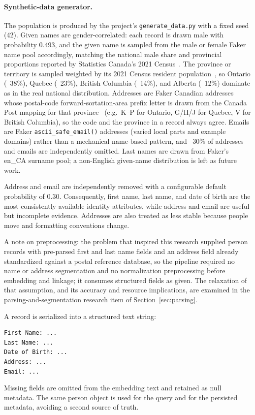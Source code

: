 \documentclass[11pt]{article}
\begin{document}
\paragraph{Synthetic-data generator.} The population is produced by the project\textquoteright s \texttt{generate\_data.py} with a fixed seed (42). Given names are gender-correlated: each record is drawn male with probability 0.493, and the given name is sampled from the male or female Faker name pool accordingly, matching the national male share and provincial proportions reported by Statistics Canada's 2021 Census~\cite{statcan2021pop}. The province or territory is sampled weighted by its 2021 Census resident population~\cite{statcan2021pop}, so Ontario (~38\%), Quebec (~23\%), British Columbia (~14\%), and Alberta (~12\%) dominate as in the real national distribution. Addresses are Faker Canadian addresses whose postal-code forward-sortation-area prefix letter is drawn from the Canada Post mapping for that province~\cite{canadapostfsa,wpcanadapost} (e.g.\ K--P for Ontario, G/H/J for Quebec, V for British Columbia), so the code and the province in a record always agree. Emails are Faker \texttt{ascii\_safe\_email()} addresses (varied local parts and example domains) rather than a mechanical name-based pattern, and ~30\% of addresses and emails are independently omitted. Last names are drawn from Faker\textquoteright s en\_CA surname pool; a non-English given-name distribution is left as future work.

Address and email are independently removed with a configurable default probability of 0.30. Consequently, first name, last name, and date of birth are the most consistently available identity attributes, while address and email are useful but incomplete evidence. Addresses are also treated as less stable because people move and formatting conventions change.

A note on preprocessing: the problem that inspired this research supplied person records with pre-parsed first and last name fields and an address field already standardized against a postal reference database, so the pipeline required no name or address segmentation and no normalization preprocessing before embedding and linkage; it consumes structured fields as given. The relaxation of that assumption, and its accuracy and resource implications, are examined in the parsing-and-segmentation research item of Section~\ref{sec:parsing}.

A record is serialized into a structured text string:
\begin{verbatim}
First Name: ...
Last Name: ...
Date of Birth: ...
Address: ...
Email: ...
\end{verbatim}
Missing fields are omitted from the embedding text and retained as null metadata. The same person object is used for the query and for the persisted metadata, avoiding a second source of truth.
\end{document}

